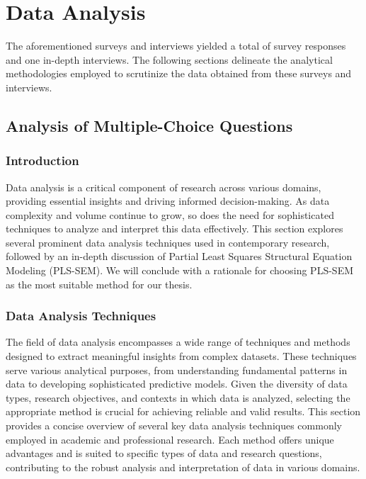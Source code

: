 \chapter{Data Analysis}

The aforementioned surveys and interviews yielded a total of \participantCount{} survey responses and one in-depth interviews. The following sections delineate the analytical methodologies employed to scrutinize the data obtained from these surveys and interviews.

\section{Analysis of Multiple-Choice Questions}
\label{sec:pls-sem}

\subsection{Introduction}

Data analysis is a critical component of research across various domains, providing essential insights and driving informed decision-making. As data complexity and volume continue to grow, so does the need for sophisticated techniques to analyze and interpret this data effectively. This section explores several prominent data analysis techniques used in contemporary research, followed by an in-depth discussion of Partial Least Squares Structural Equation Modeling (PLS-SEM). We will conclude with a rationale for choosing PLS-SEM as the most suitable method for our thesis. 

\subsection{Data Analysis Techniques}

The field of data analysis encompasses a wide range of techniques and methods designed to extract meaningful insights from complex datasets. These techniques serve various analytical purposes, from understanding fundamental patterns in data to developing sophisticated predictive models. Given the diversity of data types, research objectives, and contexts in which data is analyzed, selecting the appropriate method is crucial for achieving reliable and valid results. This section provides a concise overview of several key data analysis techniques commonly employed in academic and professional research. Each method offers unique advantages and is suited to specific types of data and research questions, contributing to the robust analysis and interpretation of data in various domains.

